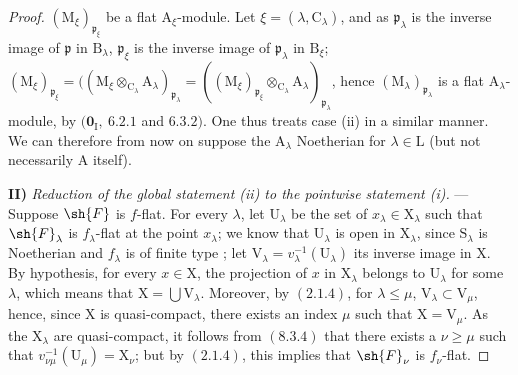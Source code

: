 \begin{proof}
$(\mathrm{M}_\xi)_{\mathfrak{p}_\xi}$ be a flat $\mathrm{A}_\xi$-module. Let $\xi=(\lambda,\mathrm{C}_\lambda)$, and as $\mathfrak{p}_\lambda$ is the inverse image of $\mathfrak{p}$ in $\mathrm{B}_\lambda$, $\mathfrak{p}_\xi$ is the inverse image of $\mathfrak{p}_\lambda$ in $\mathrm{B}_\xi$; $(\mathrm{M}_\xi)_{\mathfrak{p}_\xi}=((\mathrm{M}_\xi\otimes_{\mathrm{C}_\lambda}\mathrm{A}_\lambda)_{\mathfrak{p}_\lambda}=((\mathrm{M}_\xi)_{\mathfrak{p}_\xi}\otimes_{\mathrm{C}_\lambda}\mathrm{A}_\lambda)_{\mathfrak{p}_\lambda}$, hence $(\mathrm{M}_\lambda)_{\mathfrak{p}_\lambda}$ is a flat $\mathrm{A}_\lambda$-module, by $(\mathbf{0}_\mathrm{I},~6.2.1$ and $6.3.2)$. One thus treats case (ii) in a similar manner. We can therefore from now on suppose the $\mathrm{A}_\lambda$ Noetherian for $\lambda\in\mathrm{L}$ (but not necessarily $\mathrm{A}$ itself).

\medskip
\noindent\textbf{II)} \emph{Reduction of the global statement (ii) to the pointwise statement (i).} --- Suppose $\sh{F}$ is $f$-flat. For every $\lambda$, let $\mathrm{U}_\lambda$ be the set of $x_\lambda\in\mathrm{X}_\lambda$ such that $\sh{F}_\lambda$ is $f_\lambda$-flat at the point $x_\lambda$; we know that $\mathrm{U}_\lambda$ is open in $\mathrm{X}_\lambda$, since $\mathrm{S}_\lambda$ is Noetherian and $f_\lambda$ is of finite type ; let $\mathrm{V}_\lambda=v_\lambda^{-1}(\mathrm{U}_\lambda)$ its inverse image in $\mathrm{X}$. By hypothesis, for every $x\in\mathrm{X}$, the projection of $x$ in $\mathrm{X}_\lambda$ belongs to $\mathrm{U}_\lambda$ for some $\lambda$, which means that $\mathrm{X}=\bigcup\mathrm{V}_\lambda$. Moreover, by $(2.1.4)$, for $\lambda\leqslant\mu$, $\mathrm{V}_\lambda\subset\mathrm{V}_\mu$, hence, since $\mathrm{X}$ is quasi-compact, there exists an index $\mu$ such that $\mathrm{X}=\mathrm{V}_\mu$. As the $\mathrm{X}_\lambda$ are quasi-compact, it follows from $(8.3.4)$ that there exists a $\nu\geqslant\mu$ such that $v_{\nu\mu}^{-1}(\mathrm{U}_\mu)=\mathrm{X}_\nu$; but by $(2.1.4)$, this implies that $\sh{F}_\nu$ is $f_\nu$-flat.


\end{proof}
